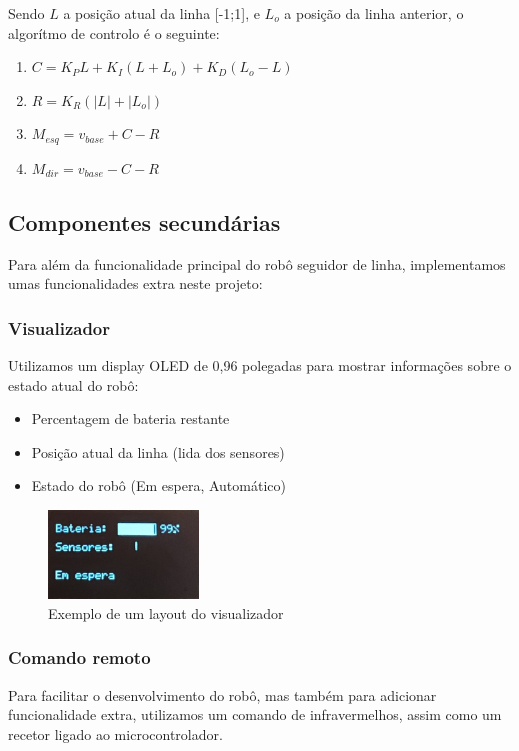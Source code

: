 \documentclass[]{report}
\begin{document}
Sendo $L$ a posição atual da linha [-1;1], e $L_o$ a posição da linha anterior, o algorítmo de controlo é o seguinte:

\begin{enumerate}
	\item $C = K_P L + K_I (L + L_o) + K_D (L_o - L)$
	\item $R = K_R (|L| + |L_o|)$
	\item $M_{esq} = v_{base} + C - R$
	\item $M_{dir} = v_{base} - C - R$
\end{enumerate}

\pagebreak

\subsection*{Componentes secundárias}
Para além da funcionalidade principal do robô seguidor de linha, implementamos umas funcionalidades extra neste projeto:

\subsubsection*{Visualizador}
Utilizamos um display OLED de 0,96 polegadas para mostrar informações sobre o estado atual do robô:

\begin{itemize}
	\item Percentagem de bateria restante
	\item Posição atual da linha (lida dos sensores)
	\item Estado do robô (Em espera, Automático)
\end{itemize}

\begin{figure}[!htb]
\centering
\includegraphics[width=4cm]{imagens/display}
\caption{Exemplo de um layout do visualizador}
\end{figure}

\subsubsection*{Comando remoto}
Para facilitar o desenvolvimento do robô, mas também para adicionar funcionalidade extra, utilizamos um comando de infravermelhos, assim como um recetor ligado ao microcontrolador.
\end{document}
